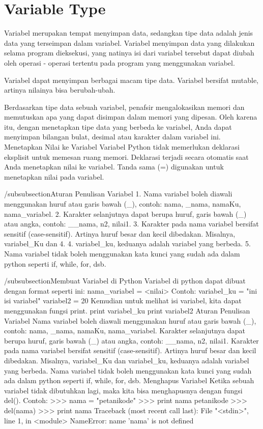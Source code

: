 \section{Variable Type}
Variabel merupakan tempat menyimpan data, sedangkan tipe data adalah jenis data yang terseimpan dalam variabel. Variabel menyimpan data yang dilakukan selama program dieksekusi, yang natinya isi dari variabel tersebut dapat diubah oleh operasi - operasi tertentu pada program yang menggunakan variabel.

Variabel dapat menyimpan berbagai macam tipe data. Variabel bersifat mutable, artinya nilainya bisa berubah-ubah.

Berdasarkan tipe data sebuah variabel, penafsir mengalokasikan memori dan memutuskan apa yang dapat disimpan dalam memori yang dipesan. Oleh karena itu, dengan menetapkan tipe data yang berbeda ke variabel, Anda dapat menyimpan bilangan bulat, desimal atau karakter dalam variabel ini.
Menetapkan Nilai ke Variabel
Variabel Python tidak memerlukan deklarasi eksplisit untuk memesan ruang memori. Deklarasi terjadi secara otomatis saat Anda menetapkan nilai ke variabel. Tanda sama (=) digunakan untuk menetapkan nilai pada variabel.

/subsubsection{Aturan Penulisan Variabel}
1. Nama variabel boleh diawali menggunakan huruf atau garis bawah (_), contoh: nama, _nama, namaKu, nama_variabel.
2. Karakter selanjutnya dapat berupa huruf, garis bawah (_) atau angka, contoh: __nama, n2, nilai1.
3. Karakter pada nama variabel bersifat sensitif (case-sensitif). Artinya huruf besar dan kecil dibedakan. Misalnya, variabel_Ku dan 4. 4. variabel_ku, keduanya adalah variabel yang berbeda.
5. Nama variabel tidak boleh menggunakan kata kunci yang sudah ada dalam python seperti if, while, for, dsb.

/subsubsection{Membuat Variabel di Python}
Variabel di python dapat dibuat dengan format seperti ini:
nama_variabel = <nilai>
Contoh:
variabel_ku = "ini isi variabel"
variabel2 = 20
Kemudian untuk melihat isi variabel, kita dapat menggunakan fungsi print.
print variabel_ku
print variabel2
Aturan Penulisan Variabel
Nama variabel boleh diawali menggunakan huruf atau garis bawah (_), contoh: nama, _nama, namaKu, nama_variabel.
Karakter selanjutnya dapat berupa huruf, garis bawah (_) atau angka, contoh: __nama, n2, nilai1.
Karakter pada nama variabel bersifat sensitif (case-sensitif). Artinya huruf besar dan kecil dibedakan. Misalnya, variabel_Ku dan variabel_ku, keduanya adalah variabel yang berbeda.
Nama variabel tidak boleh menggunakan kata kunci yang sudah ada dalam python seperti if, while, for, dsb.
Menghapus Variabel
Ketika sebuah variabel tidak dibutuhkan lagi, maka kita bisa menghapusnya dengan fungsi del().
Contoh:
>>> nama = "petanikode"
>>> print nama
petanikode
>>> del(nama)
>>> print nama
Traceback (most recent call last):
  File "<stdin>", line 1, in <module>
NameError: name 'nama' is not defined
